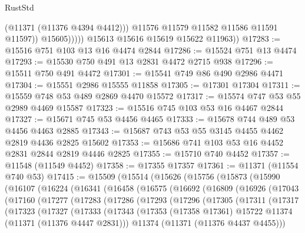 \begin{lexlean}{RustStd}
\begin{coremodule}
                        (@11371 (@11376 @4394 @4412)))
                      @11576
                      @11579
                      @11582
                      @11586
                      @11591
                      @11597))
                  @15605)))))
        @15613
        @15616
        @15619
        @15622
        @11963))
@17283 := @15516 @751 @103 @13 @16 @4474 @2844
@17286 := @15524 @751 @13 @4474
@17293 := @15530 @750 @491 @13 @2831 @4472 @2715 @938
@17296 := @15511 @750 @491 @4472
@17301 := @15541 @749 @86 @490 @2986 @4471
@17304 := @15551 @2986 @15555 @11858
@17305 := @17301 @17304
@17311 := @15559 @748 @53 @489 @2869 @4470 @15572
@17317 := @15574 @747 @53 @55 @2989 @4469 @15587
@17323 := @15516 @745 @103 @53 @16 @4467 @2844
@17327 := @15671 @745 @53 @4456 @4465
@17333 := @15678 @744 @489 @53 @4456 @4463 @2885
@17343 := @15687 @743 @53 @55 @3145 @4455 @4462 @2819 @4436 @2825 @15602
@17353 := @15686 @741 @103 @53 @16 @4452 @2831 @2844 @2819 @4446 @2825
@17355 := @15710 @740 @4452
@17357 := @11548 (@11549 @4452)
@17358 := @17355 @17357
@17361 := @11371 (@11554 @740 @53)
@17415 := @15509
    (@15514
      (@15626
        (@15756
          (@15873
            (@15990
              (@16107
                (@16224
                  (@16341
                    (@16458
                      (@16575
                        (@16692
                          (@16809
                            (@16926
                              (@17043
                                (@17160
                                  (@17277
                                    (@17283
                                      (@17286
                                        (@17293
                                          (@17296
                                            (@17305
                                              (@17311
                                                (@17317
                                                  (@17323
                                                    (@17327
                                                      (@17333
                                                        (@17343
                                                          (@17353
                                                            (@17358 @17361)
                                                            @15722
                                                            @11374
                                                            (@11371 (@11376 @4447 @2831)))
                                                          @11374
                                                          (@11371 (@11376 @4437 @4455)))

\end{coremodule}
\end{lexlean}
